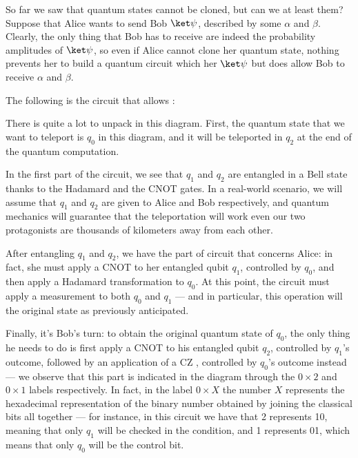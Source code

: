 \documentclass[a4paper, 12pt]{report}
\begin{document}
So far we saw that quantum states cannot be cloned, but can we at least  them? Suppose that Alice wants to send Bob $\ket \psi$, described by some $\alpha$ and $\beta$. Clearly, the only thing that Bob has to receive are indeed the probability amplitudes of $\ket \psi$, so even if Alice cannot clone her quantum state, nothing prevents her to build a quantum circuit which  her $\ket \psi$ but does allow Bob to receive $\alpha$ and $\beta$.

The following is the circuit that allows :


There is quite a lot to unpack in this diagram. First, the quantum state that we want to teleport is $q_0$ in this diagram, and it will be teleported in $q_2$ at the end of the quantum computation.

In the first part of the circuit, we see that $q_1$ and $q_2$ are entangled in a Bell state  thanks to the Hadamard and the CNOT gates. In a real-world scenario, we will assume that $q_1$ and $q_2$ are given to Alice and Bob respectively, and quantum mechanics will guarantee that the teleportation will work even our two protagonists are thousands of kilometers away from each other.

After entangling $q_1$ and $q_2$, we have the part of circuit that concerns Alice: in fact, she must apply a CNOT to her entangled qubit $q_1$, controlled by $q_0$, and then apply a Hadamard transformation to $q_0$. At this point, the circuit must apply a measurement to both $q_0$ and $q_1$ --- and in particular, this operation will  the original state as previously anticipated.

Finally, it's Bob's turn: to obtain the original quantum state of $q_0$, the only thing he needs to do is first apply a CNOT to his entangled qubit $q_2$, controlled by $q_1$'s outcome, followed by an application of a CZ , controlled by $q_0$'s outcome instead --- we observe that this part is indicated in the diagram through the $0 \times 2$ and $0 \times 1$ labels respectively. In fact, in the label $0 \times X$ the number $X$ represents the hexadecimal representation of the binary number obtained by joining the classical bits all together --- for instance, in this circuit we have that 2 represents 10, meaning that only $q_1$ will be checked in the condition, and 1 represents 01, which means that only $q_0$ will be the control bit.

\printbibliography %
\end{document}

